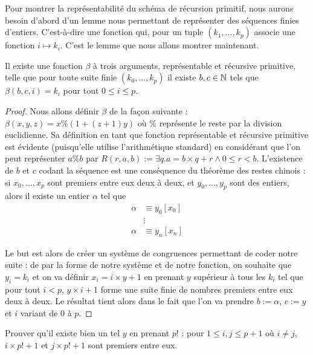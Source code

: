 Pour montrer la représentabilité du schéma de récursion primitif, nous aurons besoin d'abord d'un lemme nous permettant de représenter des séquences finies d'entiers. C'est-à-dire une fonction qui, pour un tuple $(k_1,\ldots,k_p)$ associe une fonction $i\mapsto k_i$. C'est le lemme que nous allons montrer maintenant.

\begin{lem}
    Il existe une fonction $\beta$ à trois arguments, représentable et récursive primitive, telle que pour toute suite finie $(k_0,\ldots,k_p)$ il existe $b,c\in\mathbb{N}$ tels que $\beta(b,c,i)=k_i$ pour tout $0\leq i \leq p$.
\end{lem}

\begin{proof}
    Nous allons définir $\beta$ de la façon suivante : $\beta(x,y,z) = x\% (1+(z+1)y)$ où $\%$ représente le reste par la division euclidienne. Sa définition en tant que fonction représentable et récursive primitive est évidente (puisqu'elle utilise l'arithmétique standard) en considérant que l'on peut représenter $a\%b$ par $R(r,a,b) := \exists q.a = b\times q + r\land 0 \leq r < b$. L'existence de $b$ et $c$ codant la séquence est une conséquence du théorème des restes chinois : si $x_0,\ldots,x_p$ sont premiers entre eux deux à deux, et $y_0,\ldots,y_p$ sont des entiers, alors il existe un entier $\alpha$ tel que \begin{align*}
        \alpha &\equiv y_0 [x_0]\\
        &\vdots\\
        \alpha &\equiv y_n [x_n]
    \end{align*}
    
    Le but est alors de créer un système de congruences permettant de coder notre suite : de par la forme de notre système et de notre fonction, on souhaite que $y_i=k_i$ et on va définir $x_i = i \times y + 1$ en prenant $y$ supérieur à tous les $k_i$ tel que pour tout $i<p$, $y\times i + 1$ forme une suite finie de nombres premiers entre eux deux à deux. Le résultat tient alors dans le fait que l'on va prendre $b := \alpha$, $c := y$ et $i$ variant de $0$ à $p$.
\end{proof}

\begin{exo}
    Prouver qu'il existe bien un tel $y$ en prenant $p!$ : pour $1\leq i,j \leq p+1$ où $i\neq j$, $i\times p! + 1$ et $j\times p! + 1$ sont premiers entre eux.
\end{exo}


